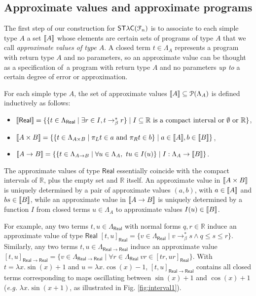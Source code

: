 \subsection{Approximate values and approximate programs}

The first step of our construction for $\mathsf{ST\lambda C}(\mathcal F_{n})$ is to associate to each simple type $A$ a set $\llbracket A \rrbracket$ whose elements are certain sets of programs of type $A$ that we call \emph{approximate values of type $A$}. 
A closed term $t\in \Lambda_{A}$ represents a program with return type $A$ and no parameters, so an approximate value can be thought as a specification of a program with return type $A$ and no parameters \emph{up to} a certain degree of error or approximation.

For each simple type $A$, the set of approximate values $\llbracket A \rrbracket\subseteq \mathcal P(\Lambda_A)$ is defined inductively as follows:
\begin{itemize}
\item $\llbracket \mathsf{Real} \rrbracket = \{ \{ t \in \Lambda_\mathsf{Real} \mid \exists r \in I, t \to_\beta^* r \} \mid I \subseteq \mathbb{R} \text{ is a compact interval or $\emptyset$ or } \mathbb{R} \}$,
\item $\llbracket A \times B \rrbracket = \{ \{ t \in \Lambda_{A \times B} \mid \pi_L t \in a \text{ and } \pi_R t \in b \} \mid a  \in \llbracket A \rrbracket, b \in \llbracket B \rrbracket \}$,
\item $\llbracket A \to B \rrbracket = \{ \{ t \in \Lambda_{A \to B} \mid \forall u \in \Lambda_{A},~ tu \in I(u) \} \mid I : \Lambda_A \to \llbracket B \rrbracket \}$.
\end{itemize}

The approximate values of type $\mathsf{Real}$ essentially coincide with the compact intervals of $\mathbb R$, plus the empty set and $\mathbb{R}$ itself. An approximate value in $\llbracket A\times B \rrbracket$ is uniquely determined by a pair of approximate values $(a,b)$, with $a\in \llbracket A \rrbracket$ and $bs\in \llbracket B \rrbracket$, while an approximate value in $\llbracket A\to B \rrbracket$ is uniquely determined by a function 
$I$ from closed terms $u\in \Lambda_{ A}$ to approximate values $I(u)\in \llbracket B \rrbracket$.

For example, any two terms $t,u\in \Lambda_{\mathsf{Real}}$ with normal forms $q,r\in \mathbb{R}$ induce an approximate value of type $\mathsf{Real}$ $[t,u]_{\mathsf{Real}}= \{v\in \Lambda_{\mathsf{Real}}\mid  v\to_{\beta}^{*} s \land q\leq s\leq r\}$. Similarly, any two terms $t,u\in \Lambda_{\mathsf{Real}\to \mathsf{Real}}$ induce an approximate value
$[t,u]_{\mathsf{Real}\to \mathsf{Real}}= \{v\in \Lambda_{\mathsf{Real}\to\mathsf{Real}}\mid  
\forall r \in \Lambda_{\mathsf{Real}} \ vr\in [ tr, ur]_{\mathsf{Real}} 
\}$. With $t= \lambda x.\sin(x)+1$ and $u=\lambda x.\cos(x)-1$, 
$[t,u]_{\mathsf{Real}\to \mathsf{Real}}$ contains all closed terms corresponding to maps oscillating between $\sin (x)+1$ and $\cos(x)+1$ (\textit{e.g.} $\lambda x. \sin(x+1)$, as illustrated in Fig. \ref{fig:interval1}).

